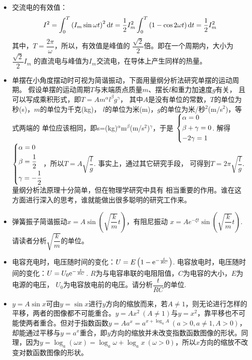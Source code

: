 \begin{itemize}[leftmargin=\inteval{\myitemleftmargin}pt,itemsep=
   \inteval{\myitemitempsep}pt,topsep=\inteval{\myitemtopsep}pt]
\item 交流电的有效值：
\begin{gather*}
I^2=\int_{0}^{T}\left( I_m\sin \omega t\right)^2 \mathrm{d} t
=\dfrac{1}{2}I_m^2 \int_{0}^{T}\left( 1-\cos 2\omega t\right) \mathrm{d} t
=\dfrac{1}{2}I_m^2
\end{gather*}
其中，$ T=\dfrac{2\pi}{\omega} $，所以，有效值是峰值的
$ \dfrac{\sqrt{2}}{2} $倍。即在一个周期内，大小为$ \dfrac{\sqrt{2}}{2}I_m $
的直流电与峰值为$ I_m $交流电，在导体上产生同样的热量。

\item 单摆在小角度摆动时可视为简谐振动，下面用量纲分析法研究单摆的运动周期。
假设单摆的运动周期$ T $与末端质点质量$ m $、摆长$ l $和重力加速度$ g $有关，
且可以写成乘积形式，即$ T=Am^{\alpha}l^{\beta}g^{\gamma} $，
其中$ A $是没有单位的常数，$ T $的单位为秒(s)，$ m $的单位为千克(kg)，
$ l $的单位为米(m)，$ g $的单位为米/秒$ ^2 $(m/s$ ^2 $)，等式两端的
单位应该相同，即s=(kg)$ ^\alpha $m$ ^\beta $(m/s$ ^2 $)$ ^\gamma $，于是
$ \begin{dcases}
    \alpha=0 \\
    \beta+\gamma =0 \\
    -2\gamma =1
\end{dcases} $. 解得
$ \begin{dcases}
    \alpha=0 \\
    \beta=\dfrac{1}{2} \\
    \gamma =-\dfrac{1}{2}
\end{dcases} $，所以$ T=A\sqrt{\dfrac{l}{g}} $. 事实上，通过其它研究手段，
可得到$ T=2\pi \sqrt{\dfrac{l}{g}} $. 量纲分析法原理十分简单，但在物理学研究中具有
相当重要的作用。谁在这方面进行深入的思考，谁就能做出很多聪明的研究工作来。

\item 弹簧振子简谐振动$ x=A\sin\left( \sqrt{\dfrac{k}{m}}t\right) $，有阻尼振动
$ x=Ae^{-\xi t}\sin\left( \sqrt{\dfrac{k}{m}}t\right) $. 
请读者分析$ \sqrt{\dfrac{k}{m}} $的单位。

\item 电容充电时，电压随时间的变化：$ U=E\left(1-\mathrm{e}^{-\frac{t}{RC}} \right) $. 
电容放电时，电压随时间的变化：$ U=U_0\mathrm{e}^{-\frac{t}{RC}}$.
$ R $为与电容串联的电阻阻值，$ C $为电容的大小，$ E $为电源的电压，
$ U_0 $为电容放电前的电压。请分析$ \dfrac{t}{RC} $的单位.

\item $ y=A\sin x $可由$ y=\sin x $进行$ y $方向的缩放而来，若$ A\neq 1 $，则无论进行怎样的平移，两者的图像都不可能重合。$ y=Ax^2\ (A\neq 1) $与$ y=x^2 $，靠平移也不可能使两者重合。但对于指数函数$ y=Aa^x=a^{x+\log_a A}\ (a>0,a\neq 1,A>0) $，却能通过平移与$ y=a^x $重合，即$ y $方向的缩放并未改变指数函数图像的形状。同理，因为$ y=\log_a(\omega x)=\log_a \omega+\log_a x \ (\omega>0) $，所以$ x $方向的缩放不改变对数函数图像的形状。


\end{itemize}
